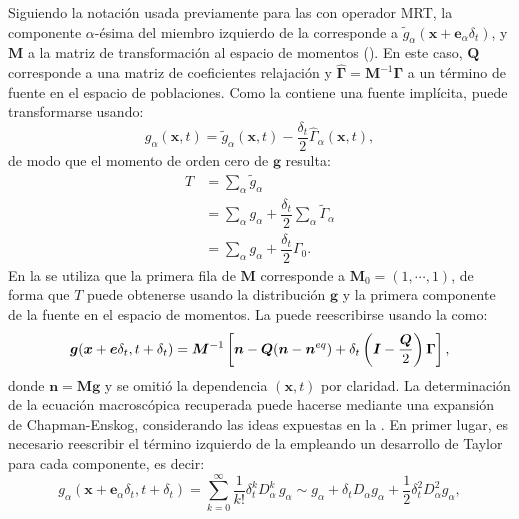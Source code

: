 Siguiendo la notaci\'on usada previamente para las \lbe{} con operador MRT, la componente $\alpha$-\'esima del miembro izquierdo de la  corresponde  a $\tilde{g}_{\alpha}(\bm{x}+\bm{e}_{\alpha}\delta_t)$, y $\bm{M}$ a la matriz de transformaci\'on al espacio de momentos ().  En este caso, $\bm{Q}$ corresponde a una matriz de coeficientes relajaci\'on y $\hat{\bm{\Gamma}} = \bm{M}^{-1}\bm{\Gamma}$ a un t\'ermino de fuente en el espacio de poblaciones. Como la  contiene una fuente impl\'icita, puede transformarse usando:
\begin{equation}
	g_{\alpha}(\bm{x},t) = \tilde{g}_{\alpha} (\bm{x},t) - \dfrac{\delta_t}{2} \hat{\Gamma}_{\alpha}(\bm{x},t),
	\label{eq:g_tilde_tranf_2d}
\end{equation}
de modo que el momento de orden cero de $\bm{g}$ resulta:
\begin{equation}
	\begin{aligned}
		T &= \sum_{\alpha} \tilde{g}_{\alpha} \\
		  &= \sum_{\alpha} g_{\alpha} + \dfrac{\delta_t}{2} \sum_{\alpha} \tilde{\Gamma}_{\alpha} \\
		  &= \sum_{\alpha} g_{\alpha} + \dfrac{\delta_t}{2} \Gamma_0.
	\end{aligned}
	\label{eq:T_macro_2d}
\end{equation}
En la  se utiliza que la primera fila de $\bm{M}$ corresponde a $\bm{M}_0 = (1, \cdots ,1)$, de forma que $T$ puede obtenerse usando la distribuci\'on $\bm{g}$ y la primera componente de la fuente en el espacio de momentos. La  puede reescribirse usando la  como:
\begin{equation}
	\bm{g}(\bm{x} + \bm{e} \delta_t, t+\delta_t) = \bm{M}^{-1} \left[ \bm{n} - \bm{Q}(\bm{n} - \bm{n}^{eq}) + \delta_t \left( \bm{I}-\dfrac{\bm{Q}}{2}\right) \bm{\Gamma}\right],
	\label{eq:g_model_2d}
\end{equation}
donde $\bm{n} = \bm{Mg}$ y se omiti\'o la dependencia $(\bm{x},t)$ por claridad. La determinaci\'on de la ecuaci\'on macrosc\'opica  recuperada puede hacerse mediante una expansi\'on de Chapman-Enskog, considerando las ideas expuestas en la . En primer lugar, es necesario reescribir el t\'ermino izquierdo de la  empleando un desarrollo de Taylor para cada componente, es decir:
\begin{equation}
	g_{\alpha}(\bm{x}+\bm{e}_{\alpha}\delta_t,t+\delta_t) = \sum_{k=0}^{\infty} \dfrac{1}{k!}\delta_t^k D_{\alpha}^{k} \, g_{\alpha} \sim g_{\alpha} + \delta_t D_{\alpha} g_{\alpha} + \dfrac{1}{2}\delta_t^2 D_{\alpha}^2g_{\alpha},
	\label{eq:taylor_gral}
\end{equation}
